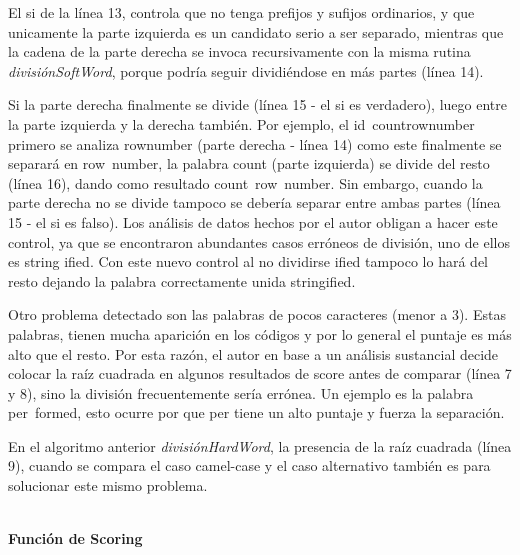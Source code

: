 El \textsf{si} de la línea 13, controla que no tenga prefijos y sufijos ordinarios, y que unicamente la parte izquierda es un candidato serio a ser separado, mientras que la cadena de la parte derecha se invoca recursivamente con la misma rutina \textit{divisiónSoftWord}, porque podría seguir dividiéndose en más partes (línea 14).

Si la parte derecha finalmente se divide (línea 15 - el \textsf{si} es verdadero), luego entre la parte izquierda y la derecha también. Por ejemplo, el \mbox{id \textsf{countrownumber}} primero se analiza \textsf{rownumber} (parte derecha - línea 14) como este finalmente se separará en \mbox{\textsf{row number}}, la palabra \textsf{count} (parte izquierda) se divide del resto (línea 16), dando como resultado \mbox{\textsf{count row number}}. Sin embargo, cuando la parte derecha no se divide tampoco se debería separar entre ambas partes (línea 15 - el \textsf{si} es falso). Los análisis de datos hechos por el autor \cite{EHPV09} obligan a hacer este control, ya que se encontraron abundantes casos erróneos de división, uno de ellos es \textsf{string ified}. Con este nuevo control al no dividirse \textsf{ified} tampoco lo hará del resto dejando la palabra correctamente unida \textsf{stringified}. 




Otro problema detectado son las palabras de pocos caracteres (menor a 3). Estas palabras, tienen mucha aparición en los códigos y por lo general el puntaje es más alto que el resto. Por esta razón, el autor \cite{EHPV09} en base a un análisis sustancial decide colocar la raíz cuadrada en algunos resultados de score antes de comparar (línea 7 y 8), sino la división frecuentemente sería errónea. Un ejemplo es la palabra \mbox{\textsf{per formed}}, esto ocurre por que \textsf{per} tiene un alto puntaje y fuerza la separación.

En el algoritmo anterior \textit{divisiónHardWord}, la presencia de la raíz cuadrada (línea 9), cuando se compara el caso camel-case y el caso alternativo también es para solucionar este mismo problema.

\noindent \textbf{\\Función de Scoring\\}

